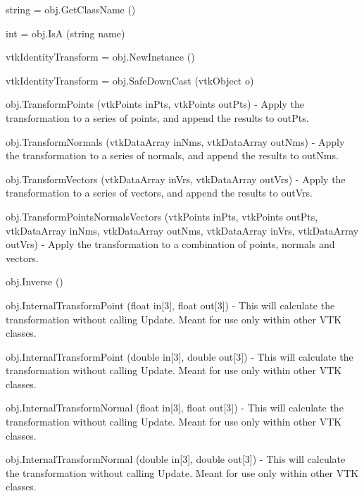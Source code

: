 \begin{DoxyItemize}
\item {\ttfamily string = obj.\-Get\-Class\-Name ()}  
\item {\ttfamily int = obj.\-Is\-A (string name)}  
\item {\ttfamily vtk\-Identity\-Transform = obj.\-New\-Instance ()}  
\item {\ttfamily vtk\-Identity\-Transform = obj.\-Safe\-Down\-Cast (vtk\-Object o)}  
\item {\ttfamily obj.\-Transform\-Points (vtk\-Points in\-Pts, vtk\-Points out\-Pts)} -\/ Apply the transformation to a series of points, and append the results to out\-Pts.  
\item {\ttfamily obj.\-Transform\-Normals (vtk\-Data\-Array in\-Nms, vtk\-Data\-Array out\-Nms)} -\/ Apply the transformation to a series of normals, and append the results to out\-Nms.  
\item {\ttfamily obj.\-Transform\-Vectors (vtk\-Data\-Array in\-Vrs, vtk\-Data\-Array out\-Vrs)} -\/ Apply the transformation to a series of vectors, and append the results to out\-Vrs.  
\item {\ttfamily obj.\-Transform\-Points\-Normals\-Vectors (vtk\-Points in\-Pts, vtk\-Points out\-Pts, vtk\-Data\-Array in\-Nms, vtk\-Data\-Array out\-Nms, vtk\-Data\-Array in\-Vrs, vtk\-Data\-Array out\-Vrs)} -\/ Apply the transformation to a combination of points, normals and vectors.  
\item {\ttfamily obj.\-Inverse ()}  
\item {\ttfamily obj.\-Internal\-Transform\-Point (float in\mbox{[}3\mbox{]}, float out\mbox{[}3\mbox{]})} -\/ This will calculate the transformation without calling Update. Meant for use only within other V\-T\-K classes.  
\item {\ttfamily obj.\-Internal\-Transform\-Point (double in\mbox{[}3\mbox{]}, double out\mbox{[}3\mbox{]})} -\/ This will calculate the transformation without calling Update. Meant for use only within other V\-T\-K classes.  
\item {\ttfamily obj.\-Internal\-Transform\-Normal (float in\mbox{[}3\mbox{]}, float out\mbox{[}3\mbox{]})} -\/ This will calculate the transformation without calling Update. Meant for use only within other V\-T\-K classes.  
\item {\ttfamily obj.\-Internal\-Transform\-Normal (double in\mbox{[}3\mbox{]}, double out\mbox{[}3\mbox{]})} -\/ This will calculate the transformation without calling Update. Meant for use only within other V\-T\-K classes.  

\end{DoxyItemize}
